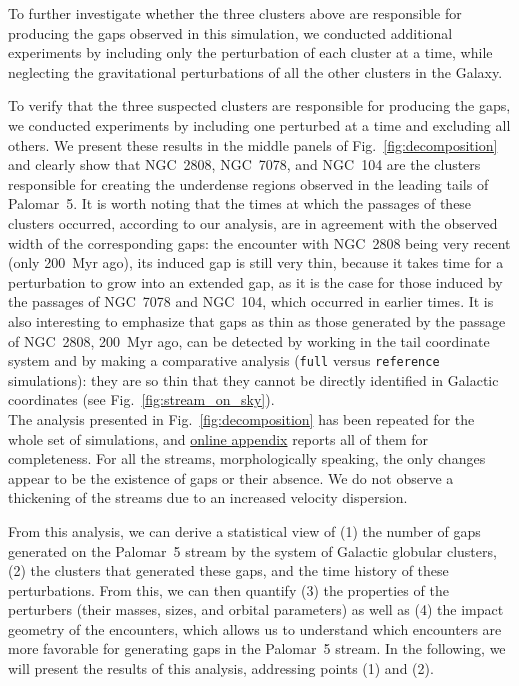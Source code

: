         To further investigate whether the three clusters above are responsible for producing the gaps observed in this simulation, we conducted additional experiments by including only the perturbation of each cluster at a time, while neglecting the gravitational perturbations of all the other clusters in the Galaxy.
    
        To verify that the three suspected clusters are responsible for producing the gaps, we conducted experiments by including one perturbed at a time and excluding all others. We present these results in the middle panels of Fig.~\ref{fig:decomposition} and clearly show that NGC~2808, NGC~7078, and NGC~104 are the clusters responsible for creating the underdense regions observed in the leading tails of Palomar~5. It is worth noting that the times at which the passages of these clusters occurred, according to our analysis, are in agreement with the observed width of the corresponding gaps: the encounter with NGC~2808 being very recent (only 200~Myr ago), its induced gap is still very thin, because it takes time for a perturbation to grow into an extended gap, as it is the case for those induced by the passages of  NGC~7078 and NGC~104, which occurred in earlier times. It is also interesting to emphasize that gaps as thin as those generated by the passage of NGC~2808, 200~Myr ago, can be detected by working in the tail coordinate system and by making a comparative analysis (\texttt{full} versus \texttt{reference} simulations): they are so thin that they cannot be directly identified in Galactic coordinates (see Fig.~\ref{fig:stream_on_sky}).\\

        The analysis presented in Fig.~\ref{fig:decomposition} has been repeated for the whole set of simulations, and \href{https://doi.org/10.5281/zenodo.15528089}{online appendix} reports all of them for completeness. For all the streams, morphologically speaking, the only changes appear to be the existence of gaps or their absence. We do not observe a thickening of the streams due to an increased velocity dispersion. 
    
        From this analysis, we can derive a statistical view of (1) the number of gaps generated on the Palomar~5 stream by the system of Galactic globular clusters, (2) the clusters that generated these gaps, and the time history of these perturbations. From this, we can then quantify (3) the properties of the perturbers (their masses, sizes, and orbital parameters) as well as (4) the impact geometry of the encounters, which allows us to understand which encounters are more favorable for generating gaps in the Palomar~5 stream. In the following, we will present the results of this analysis, addressing points (1) and (2).


